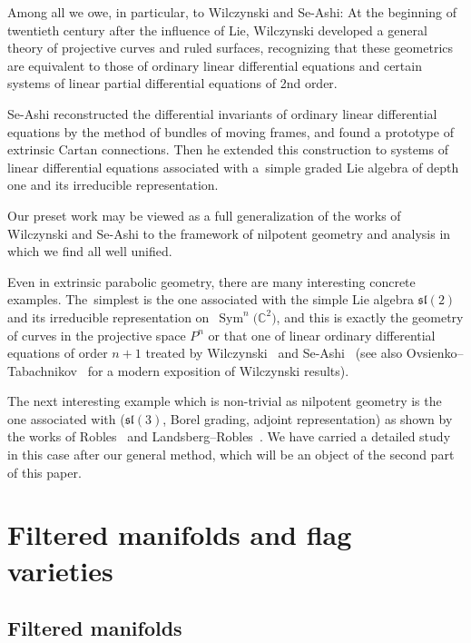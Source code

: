 \documentclass[pdftex]{sigma}%
\newcommand{\Sym}{\operatorname{Sym}}
\numberwithin{equation}{section}
\begin{document}
Among all we owe, in particular, to Wilczynski and Se-Ashi:
At the beginning of twentieth century after the influence of Lie, Wilczynski developed a general theory of projective curves and ruled surfaces, recognizing that these geometrics are equivalent to those of ordinary linear differential equations and certain systems of linear partial differential equations of 2nd order.

Se-Ashi reconstructed the differential invariants of ordinary linear differential equations by the method of bundles of moving frames, and found a prototype of extrinsic Cartan connections.
Then he extended this construction to systems of linear differential equations associated with a~simple graded Lie algebra of depth one and its irreducible representation.

Our preset work may be viewed as a full generalization of the works of Wilczynski and Se-Ashi to the framework of nilpotent geometry and analysis in which we find all well unified.

Even in extrinsic parabolic geometry, there are many interesting concrete examples. The~sim\-plest is the one associated with the simple Lie algebra $\mathfrak{sl}(2)$ and its irreducible representation on~$\Sym^n\big(\mathbb C^2\big)$, and this is exactly the geometry of curves in the projective space $P^n$ or that one of linear ordinary differential equations of order $n+1$ treated by Wilczynski~\cite{wilch} and Se-Ashi~\cite{se1,se2} (see also Ovsienko--Tabachnikov~\cite{O-T} for a modern exposition of Wilczynski results).

The next interesting example which is non-trivial as nilpotent geometry is the one associated with ($\mathfrak{sl}(3)$, Borel grading, adjoint representation) as shown by the works of Robles~\cite{robles} and Landsberg--Robles~\cite{landrob}. We have carried a detailed study in this case after our general method,
which will be an object of the second part of this paper.

\section{Filtered manifolds and flag varieties}\label{sec2}

\subsection{Filtered manifolds}
\end{document}
